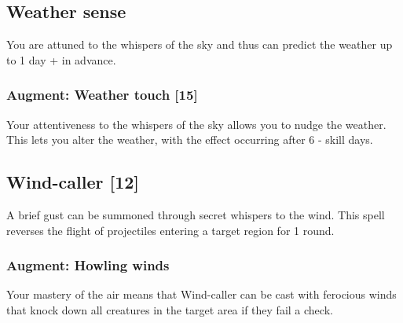 \subsection{Weather sense}
You are attuned to the whispers of the sky and thus can predict the weather up to 1 day +  in advance.
\subsubsection{Augment: Weather touch [15]}
Your attentiveness to the whispers of the sky allows you to nudge the weather. This lets you alter the weather, with the effect occurring after 6 -  skill days. 

\subsection{Wind-caller [12]}
A brief gust can be summoned through secret whispers to the wind. This spell reverses the flight of projectiles entering a target region for 1 round. 
\subsubsection{Augment: Howling winds}
Your mastery of the air means that Wind-caller can be cast with ferocious winds that knock down all creatures in the target area if they fail a  check.




